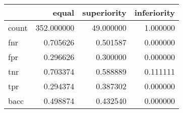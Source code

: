 \begin{tabular}{lrrr}
\toprule
{} &       equal &  superiority &  inferiority \\
\midrule
count &  352.000000 &    49.000000 &     1.000000 \\
fnr   &    0.705626 &     0.501587 &     0.000000 \\
fpr   &    0.296626 &     0.300000 &     0.000000 \\
tnr   &    0.703374 &     0.588889 &     0.111111 \\
tpr   &    0.294374 &     0.387302 &     0.000000 \\
bacc  &    0.498874 &     0.432540 &     0.000000 \\
\bottomrule
\end{tabular}
